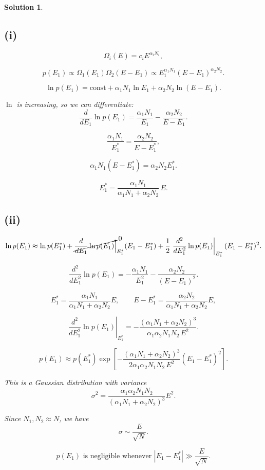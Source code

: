 \documentclass[11pt]{article}
\newtheorem*{solution}{Solution}
\begin{document}
\begin{solution}
\subsection*{(i)}

\[
\Omega_i(E)=c_iE^{\alpha_iN_i},
\]

\[
p(E_1)\propto \Omega_1(E_1)\Omega_2(E-E_1)
\propto E_1^{\alpha_1N_1}(E-E_1)^{\alpha_2N_2}.
\]

\[
\ln p(E_1)
=
\text{const}
+\alpha_1N_1\ln E_1
+\alpha_2N_2\ln(E-E_1).
\]

$\ln$ is increasing, so we can differentiate:
\[
\frac{d}{dE_1}\ln p(E_1)
=
\frac{\alpha_1N_1}{E_1}
-
\frac{\alpha_2N_2}{E-E_1}.
\]

\[
\frac{\alpha_1N_1}{E_1^*}
=
\frac{\alpha_2N_2}{E-E_1^*},
\]

\[
\alpha_1N_1(E-E_1^*)
=
\alpha_2N_2E_1^*.
\]

\[
E_1^*
=
\frac{\alpha_1N_1}
{\alpha_1N_1+\alpha_2N_2}\,E.
\]

\subsection*{(ii)}

\[
\ln p(E_1)
\approx
\ln p(E_1^*)
+
\cancelto{0}{\frac{d}{dE_1}\ln p(E_1)}\Big|_{E_1^*}(E_1-E_1^*)
+
\frac12
\left.
\frac{d^2}{dE_1^2}\ln p(E_1)
\right|_{E_1^*}
(E_1-E_1^*)^2.
\]

\[
\frac{d^2}{dE_1^2}\ln p(E_1)
=
-\frac{\alpha_1N_1}{E_1^2}
-
\frac{\alpha_2N_2}{(E-E_1)^2}.
\]

\[
E_1^*
=
\frac{\alpha_1N_1}{\alpha_1N_1+\alpha_2N_2}E,
\qquad
E-E_1^*
=
\frac{\alpha_2N_2}{\alpha_1N_1+\alpha_2N_2}E,
\]

\[
\left.
\frac{d^2}{dE_1^2}\ln p(E_1)
\right|_{E_1^*}
=
-
\frac{(\alpha_1N_1+\alpha_2N_2)^3}
{\alpha_1\alpha_2N_1N_2\,E^2}.
\]

\[
p(E_1)
\approx
p(E_1^*)
\exp\left[
-
\frac{(\alpha_1N_1+\alpha_2N_2)^3}
{2\alpha_1\alpha_2N_1N_2\,E^2}
(E_1-E_1^*)^2
\right].
\]

This is a Gaussian distribution with variance
\[
\sigma^2
=
\frac{\alpha_1\alpha_2N_1N_2}
{(\alpha_1N_1+\alpha_2N_2)^3}
E^2.
\]

Since \(N_1,N_2\approx N\), we have
\[
\sigma
\sim
\frac{E}{\sqrt{N}}.
\]

\[
\boxed{
p(E_1)\text{ is negligible whenever }
|E_1-E_1^*|
\gg
\frac{E}{\sqrt{N}}.
}
\]
\end{solution}
\end{document}
